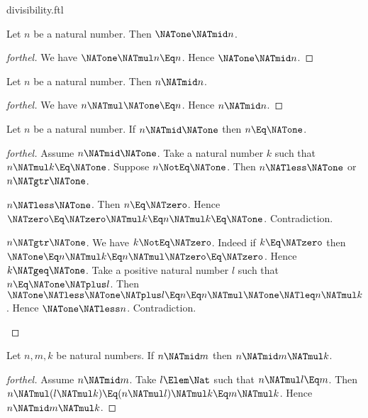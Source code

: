 \documentclass{stex}
\begin{document}
\begin{smodule}{divisibility.ftl}
\begin{proposition}[forthel]
  Let $n$ be a natural number.
  Then $\NATone \NATmid n$.
\end{proposition}
\begin{proof}[forthel]
  We have $\NATone \NATmul n \Eq n$.
  Hence $\NATone \NATmid n$.
\end{proof}

\begin{proposition}[forthel]
  Let $n$ be a natural number.
  Then $n \NATmid n$.
\end{proposition}
\begin{proof}[forthel]
  We have $n \NATmul \NATone \Eq n$.
  Hence $n \NATmid n$.
\end{proof}

\begin{proposition}[forthel]
  Let $n$ be a natural number.
  If $n \NATmid \NATone$ then $n \Eq \NATone$.
\end{proposition}
\begin{proof}[forthel]
  Assume $n \NATmid \NATone$.
  Take a natural number $k$ such that $n \NATmul k \Eq \NATone$.
  Suppose $n \NotEq \NATone$.
  Then $n \NATless \NATone$ or $n \NATgtr \NATone$.

  \begin{case}{$n \NATless \NATone$.}
    Then $n \Eq \NATzero$.
    Hence $\NATzero
      \Eq \NATzero \NATmul k
      \Eq n \NATmul k
      \Eq \NATone$.
    Contradiction.
  \end{case}

  \begin{case}{$n \NATgtr \NATone$.}
    We have $k \NotEq \NATzero$.
    Indeed if $k \Eq \NATzero$ then
    $\NATone
      \Eq n \NATmul k
      \Eq n \NATmul \NATzero
      \Eq \NATzero$.
    Hence $k \NATgeq \NATone$.
    Take a positive natural number $l$ such that $n \Eq \NATone \NATplus l$.
    Then $\NATone
      \NATless \NATone \NATplus l
      \Eq n
      \Eq n \NATmul \NATone
      \NATleq n \NATmul k$.
    Hence $\NATone \NATless n$.
    Contradiction.
  \end{case}
\end{proof}

\begin{proposition}[forthel]
  Let $n, m, k$ be natural numbers.
  If $n \NATmid m$ then $n \NATmid m \NATmul k$.
\end{proposition}
\begin{proof}[forthel]
  Assume $n \NATmid m$.
  Take $l \Elem \Nat$ such that $n \NATmul l \Eq m$.
  Then $n \NATmul (l \NATmul k)
    \Eq (n \NATmul l) \NATmul k
    \Eq m \NATmul k$.
  Hence $n \NATmid m \NATmul k$.
\end{proof}


\end{smodule}
\end{document}
